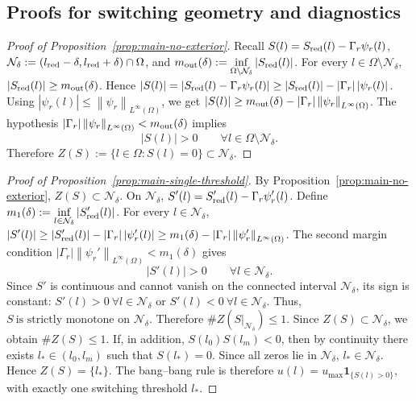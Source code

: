 \documentclass[pdflatex,sn-mathphys-num]{sn-jnl}
\theoremstyle{thmstyleone}
\theoremstyle{definition}
\theoremstyle{remark}
\newcommand{\Om}{\Omega}
\newcommand{\norm}[1]{\left\lVert#1\right\rVert}
\newcommand{\abs}[1]{\left\lvert#1\right\rvert}
\numberwithin{equation}{section}
\begin{document}
\subsection{Proofs for switching geometry and diagnostics}
\label{subsec:proof-switching-diagnostics}
\begin{proof}[Proof of Proposition~\ref{prop:main-no-exterior}]
Recall
$\displaystyle 
S(l)=S_{\rm red}(l)-\Gamma_r\psi_r(l)$,
$\displaystyle 
\mathcal N_\delta
:=
(l_{\rm red}-\delta,l_{\rm red}+\delta)\cap\Om$,
and
$\displaystyle 
m_{\rm out}(\delta)
:=
\inf_{\Om\setminus\mathcal N_\delta}
\abs{S_{\rm red}(l)}$.
For every \(l\in\Om\setminus\mathcal N_\delta\),
$\displaystyle 
\abs{S_{\rm red}(l)}\ge m_{\rm out}(\delta)$.
Hence
$\displaystyle 
\abs{S(l)}
=
\abs{S_{\rm red}(l)-\Gamma_r\psi_r(l)}
\ge
\abs{S_{\rm red}(l)}
-
\abs{\Gamma_r}\abs{\psi_r(l)}$.
Using
$\displaystyle 
\abs{\psi_r(l)}\le\norm{\psi_r}_{L^\infty(\Om)}$,
we get
$\displaystyle 
\abs{S(l)}
\ge
m_{\rm out}(\delta)
-
\abs{\Gamma_r}\norm{\psi_r}_{L^\infty(\Om)}$.
The hypothesis
$\displaystyle 
\abs{\Gamma_r}\norm{\psi_r}_{L^\infty(\Om)}
<
m_{\rm out}(\delta)$
implies
\[
\abs{S(l)}>0
\qquad
\forall l\in\Om\setminus\mathcal N_\delta .
\]
Therefore
$\displaystyle 
Z(S):=\{l\in\Om:S(l)=0\}
\subset
\mathcal N_\delta$.
\end{proof}
\begin{proof}[Proof of Proposition~\ref{prop:main-single-threshold}]
By Proposition~\ref{prop:main-no-exterior},
$\displaystyle 
Z(S)\subset\mathcal N_\delta$.
On \(\mathcal N_\delta\),
$\displaystyle 
S'(l)=S_{\rm red}'(l)-\Gamma_r\psi_r'(l)$.
Define
$\displaystyle 
m_1(\delta)
:=
\inf_{l\in\mathcal N_\delta}
\abs{S_{\rm red}'(l)}$.
For every \(l\in\mathcal N_\delta\),
$\displaystyle 
\abs{S'(l)}
\ge
\abs{S_{\rm red}'(l)}
-
\abs{\Gamma_r}\abs{\psi_r'(l)}
\ge
m_1(\delta)
-
\abs{\Gamma_r}\norm{\psi_r'}_{L^\infty(\Om)}$.
The second margin condition
$\displaystyle 
\abs{\Gamma_r}\norm{\psi_r'}_{L^\infty(\Om)}
<
m_1(\delta)$
gives
\[
\abs{S'(l)}>0
\qquad
\forall l\in\mathcal N_\delta .
\]
Since \(S'\) is continuous and cannot vanish on the connected interval
\(\mathcal N_\delta\), its sign is constant:
$\displaystyle 
S'(l)>0\ \forall l\in\mathcal N_\delta$
 or 
$S'(l)<0\ \forall l\in\mathcal N_\delta$.
Thus,
$\displaystyle S\ \text{is strictly monotone on }\mathcal N_\delta$.
Therefore
$\displaystyle 
\#Z(S\vert_{\mathcal N_\delta})\le1$.
Since
$\displaystyle 
Z(S)\subset\mathcal N_\delta$,
we obtain
$\displaystyle 
\#Z(S)\le1$.
If, in addition,
$\displaystyle 
S(l_0)S(l_m)<0$,
then by continuity there exists
$\displaystyle 
l_*\in(l_0,l_m)$
such that $\displaystyle S(l_*)=0$.
Since all zeros lie in \(\mathcal N_\delta\),
$\displaystyle 
l_*\in\mathcal N_\delta$.
Hence
$\displaystyle 
Z(S)=\{l_*\}$.
The bang--bang rule is therefore
$\displaystyle 
u(l)=u_{\max}\mathbf 1_{\{S(l)>0\}}$,
with exactly one switching threshold \(l_*\).
\end{proof}
\end{document}
